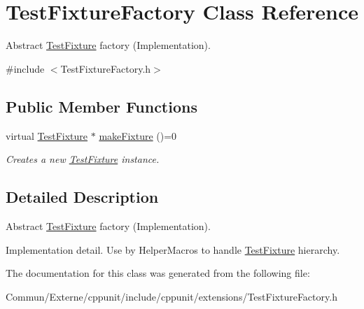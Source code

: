 \hypertarget{class_test_fixture_factory}{}\section{Test\+Fixture\+Factory Class Reference}
\label{class_test_fixture_factory}


Abstract \hyperlink{class_test_fixture}{Test\+Fixture} factory (Implementation).  




{\ttfamily \#include $<$Test\+Fixture\+Factory.\+h$>$}

\subsection*{Public Member Functions}
\begin{DoxyCompactItemize}
\item 
virtual \hyperlink{class_test_fixture}{Test\+Fixture} $\ast$ \hyperlink{class_test_fixture_factory_a50ae33b88d818ef819478e47929a820c}{make\+Fixture} ()=0\hypertarget{class_test_fixture_factory_a50ae33b88d818ef819478e47929a820c}{}\label{class_test_fixture_factory_a50ae33b88d818ef819478e47929a820c}

\begin{DoxyCompactList}\small\item\em Creates a new \hyperlink{class_test_fixture}{Test\+Fixture} instance. \end{DoxyCompactList}\end{DoxyCompactItemize}


\subsection{Detailed Description}
Abstract \hyperlink{class_test_fixture}{Test\+Fixture} factory (Implementation). 

Implementation detail. Use by Helper\+Macros to handle \hyperlink{class_test_fixture}{Test\+Fixture} hierarchy. 

The documentation for this class was generated from the following file\+:\begin{DoxyCompactItemize}
\item 
Commun/\+Externe/cppunit/include/cppunit/extensions/Test\+Fixture\+Factory.\+h\end{DoxyCompactItemize}
